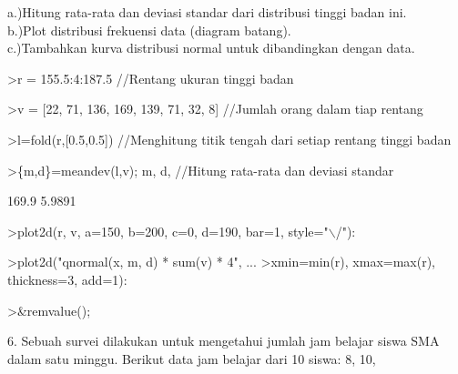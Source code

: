 \documentclass{article}
\begin{document}
\begin{eulernotebook}
\begin{eulercomment}
\begin{eulercomment}
\begin{eulercomment}
\begin{eulercomment}
\begin{eulercomment}
\begin{eulercomment}
\begin{eulercomment}
\begin{eulercomment}
\begin{eulercomment}
\begin{eulercomment}
\begin{eulercomment}
\begin{eulercomment}
\begin{eulercomment}
\begin{eulercomment}
\begin{eulercomment}
\begin{eulercomment}
\begin{eulercomment}
a.)Hitung rata-rata dan deviasi standar dari distribusi tinggi badan
ini.\\
b.)Plot distribusi frekuensi data (diagram batang).\\
c.)Tambahkan kurva distribusi normal untuk dibandingkan dengan data.
\end{eulercomment}
\begin{eulerprompt}
>r = 155.5:4:187.5  //Rentang ukuran tinggi badan
\end{eulerprompt}
\begin{euleroutput}
  [155.5,  159.5,  163.5,  167.5,  171.5,  175.5,  179.5,  183.5,  187.5]
\end{euleroutput}
\begin{eulerprompt}
>v = [22, 71, 136, 169, 139, 71, 32, 8] //Jumlah orang dalam tiap rentang
\end{eulerprompt}
\begin{euleroutput}
  [22,  71,  136,  169,  139,  71,  32,  8]
\end{euleroutput}
\begin{eulerprompt}
>l=fold(r,[0.5,0.5])  //Menghitung titik tengah dari setiap rentang tinggi badan
\end{eulerprompt}
\begin{euleroutput}
  [157.5,  161.5,  165.5,  169.5,  173.5,  177.5,  181.5,  185.5]
\end{euleroutput}
\begin{eulerprompt}
>\{m,d\}=meandev(l,v); m, d,  //Hitung rata-rata dan deviasi standar
\end{eulerprompt}
\begin{euleroutput}
  169.9
  5.9891
\end{euleroutput}
\begin{eulerprompt}
>plot2d(r, v, a=150, b=200, c=0, d=190, bar=1, style="\(\backslash\)/"):
\end{eulerprompt}
\begin{eulerprompt}
>plot2d("qnormal(x, m, d) * sum(v) * 4", ...
>xmin=min(r), xmax=max(r), thickness=3, add=1):
\end{eulerprompt}
\begin{eulerprompt}
>&remvalue();
\end{eulerprompt}
\begin{eulercomment}
6. Sebuah survei dilakukan untuk mengetahui jumlah jam belajar siswa
SMA dalam satu minggu. Berikut data jam belajar dari 10 siswa: 8, 10,

\end{eulercomment}
\end{eulercomment}
\end{eulercomment}
\end{eulercomment}
\end{eulercomment}
\end{eulercomment}
\end{eulercomment}
\end{eulercomment}
\end{eulercomment}
\end{eulercomment}
\end{eulercomment}
\end{eulercomment}
\end{eulercomment}
\end{eulercomment}
\end{eulercomment}
\end{eulercomment}
\end{eulercomment}
\end{eulernotebook}
\end{document}
